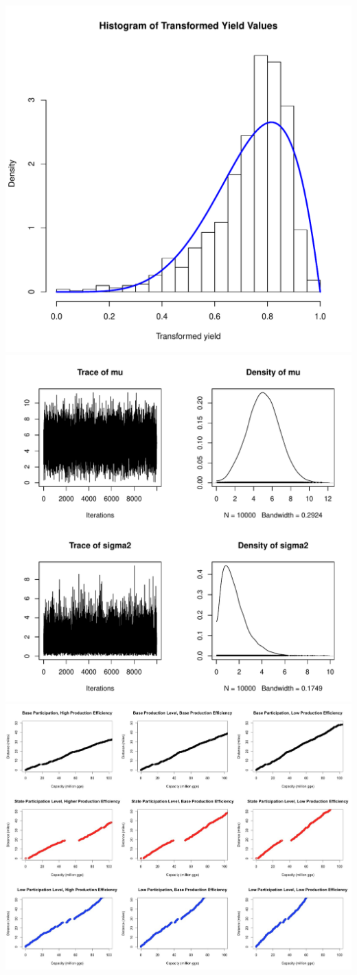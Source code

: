 \documentclass[12pt]{article}\usepackage[]{graphicx}\usepackage[]{color}
\begin{document}
\includegraphics{Histogram_of_yield_fit}
\includegraphics{Sampler}
\includegraphics{part_prod}
\end{document}
